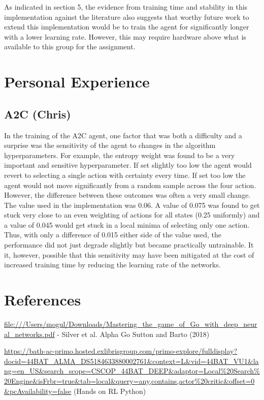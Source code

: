 \documentclass{article}
\begin{document}
As indicated in section 5, the evidence from training time and stability in this implementation against the literature also suggests that worthy future work to extend this implementation would be to train the agent for significantly longer with a lower learning rate. However, this may require hardware above what is available to this group for the assignment.

\section{Personal Experience}

\subsection{A2C (Chris)}

In the training of the A2C agent, one factor that was both a difficulty and a surprise was the sensitivity of the agent to changes in the algorithm hyperparameters. For example, the entropy weight was found to be a very important and sensitive hyperparameter. If set slightly too low the agent would revert to selecting a single action with certainty every time. If set too low the agent would not move significantly from a random sample across the four action. However, the difference between these outcomes was often a very small change. The value used in the implementation was 0.06. A value of 0.075 was found to get stuck very close to an even weighting of actions for all states (0.25 uniformly) and a value of 0.045 would get stuck in a local minima of selecting only one action. Thus, with only a difference of 0.015 either side of the value used, the performance did not just degrade slightly but became practically untrainable. It it, however, possible that this sensitivity may have been mitigated at the cost of increased training time by reducing the learning rate of the networks.

\section*{References}


\url{file:///Users/mogul/Downloads/Mastering_the_game_of_Go_with_deep_neural_networks.pdf} - Silver et al. Alpha Go
Sutton and Barto (2018)

\url{https://bath-ac-primo.hosted.exlibrisgroup.com/primo-explore/fulldisplay?docid=44BAT_ALMA_DS5184633880002761&context=L&vid=44BAT_VU1&lang=en_US&search_scope=CSCOP_44BAT_DEEP&adaptor=Local%20Search%20Engine&isFrbr=true&tab=local&query=any,contains,actor%20critic&offset=0&pcAvailability=false} (Hands on RL Python)
\end{document}
